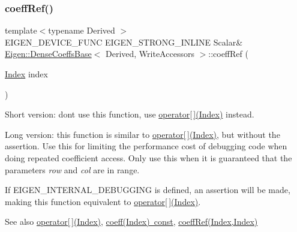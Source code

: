 \subsubsection{\texorpdfstring{coeffRef()}{coeffRef()}\hspace{0.1cm}{\footnotesize\ttfamily [2/2]}}
{\footnotesize\ttfamily template$<$typename Derived $>$ \\
E\+I\+G\+E\+N\+\_\+\+D\+E\+V\+I\+C\+E\+\_\+\+F\+U\+NC E\+I\+G\+E\+N\+\_\+\+S\+T\+R\+O\+N\+G\+\_\+\+I\+N\+L\+I\+NE Scalar\& \mbox{\hyperlink{class_eigen_1_1_dense_coeffs_base}{Eigen\+::\+Dense\+Coeffs\+Base}}$<$ Derived, Write\+Accessors $>$\+::coeff\+Ref (\begin{DoxyParamCaption}\item[{\mbox{\hyperlink{struct_eigen_1_1_eigen_base_a554f30542cc2316add4b1ea0a492ff02}{Index}}}]{index }\end{DoxyParamCaption})\hspace{0.3cm}{\ttfamily [inline]}}

Short version\+: don\textquotesingle{}t use this function, use \mbox{\hyperlink{class_eigen_1_1_dense_coeffs_base_3_01_derived_00_01_write_accessors_01_4_a38f5d78476b3db56db98853af750cf31}{operator\mbox{[}$\,$\mbox{]}(\+Index)}} instead.

Long version\+: this function is similar to \mbox{\hyperlink{class_eigen_1_1_dense_coeffs_base_3_01_derived_00_01_write_accessors_01_4_a38f5d78476b3db56db98853af750cf31}{operator\mbox{[}$\,$\mbox{]}(\+Index)}}, but without the assertion. Use this for limiting the performance cost of debugging code when doing repeated coefficient access. Only use this when it is guaranteed that the parameters {\itshape row} and {\itshape col} are in range.

If E\+I\+G\+E\+N\+\_\+\+I\+N\+T\+E\+R\+N\+A\+L\+\_\+\+D\+E\+B\+U\+G\+G\+I\+NG is defined, an assertion will be made, making this function equivalent to \mbox{\hyperlink{class_eigen_1_1_dense_coeffs_base_3_01_derived_00_01_write_accessors_01_4_a38f5d78476b3db56db98853af750cf31}{operator\mbox{[}$\,$\mbox{]}(\+Index)}}.

\begin{DoxySeeAlso}{See also}
\mbox{\hyperlink{class_eigen_1_1_dense_coeffs_base_3_01_derived_00_01_write_accessors_01_4_a38f5d78476b3db56db98853af750cf31}{operator\mbox{[}$\,$\mbox{]}(\+Index)}}, \mbox{\hyperlink{class_eigen_1_1_dense_coeffs_base_3_01_derived_00_01_read_only_accessors_01_4_ad52344ad1f42852db71996590d2de0de}{coeff(\+Index) const}}, \mbox{\hyperlink{class_eigen_1_1_dense_coeffs_base_3_01_derived_00_01_write_accessors_01_4_adf14e9563a1d2a39a6fee334dfcfb105}{coeff\+Ref(\+Index,\+Index)}} 
\end{DoxySeeAlso}
\mbox{\label{class_eigen_1_1_dense_coeffs_base_3_01_derived_00_01_write_accessors_01_4_a7b0b45c7351847696c911ce8aa2abbdb}} 
